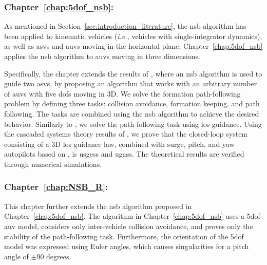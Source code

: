 
\subsubsection{Chapter~\ref{chap:5dof_nsb}: }

As mentioned in Section~\ref{sec:introduction_literature}, the \gls{nsb} algorithm has been applied to kinematic vehicles (\emph{i.e.,} vehicles with single-integrator dynamics), as well as \glspl{asv} and \glspl{auv} moving in the horizontal plane.
Chapter~\ref{chap:5dof_nsb} applies the \gls{nsb} algorithm to \glspl{auv} moving in three dimensions.

Specifically, the chapter extends the results of \cite{eek_formation_2021}, where an \gls{nsb} algorithm is used to guide two \glspl{asv}, by proposing an algorithm that works with an arbitrary number of \glspl{auv} with five \glspl{dof} moving in 3D.
We solve the formation path-following problem by defining three tasks: collision avoidance, formation keeping, and path following.
The tasks are combined using the \gls{nsb} algorithm to achieve the desired behavior.
Similarly to \cite{eek_formation_2021}, we solve the path-following task using \gls{los} guidance.
Using the cascaded systems theory results of \cite{pettersen_lyapunov_2017}, we prove that the closed-loop system consisting of a 3D \gls{los} guidance law, combined with surge, pitch, and yaw autopilots based on \cite{moe_LOS_2016}, is \glspl{usges} and \glspl{ugas}.
The theoretical results are verified through numerical simulations.

\subsubsection{Chapter~\ref{chap:NSB_R}: }

This chapter further extends the \gls{nsb} algorithm proposed in Chapter~\ref{chap:5dof_nsb}.
The algorithm in Chapter~\ref{chap:5dof_nsb} uses a 5\gls{dof} \gls{auv} model, considers only inter-vehicle collision avoidance, and proves only the stability of the path-following task.
Furthermore, the orientation of the 5\gls{dof} model was expressed using Euler angles, which causes singularities for a pitch angle of $\pm90$ degrees.

